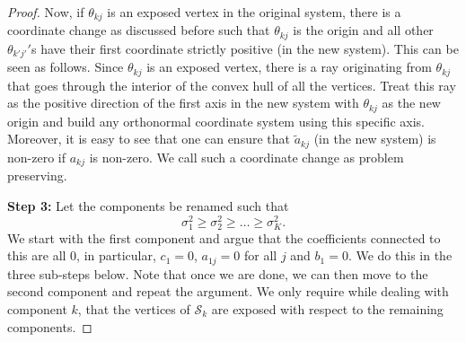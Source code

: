 \documentclass[bj,authoryear]{imsart}
\theoremstyle{plain}
\theoremstyle{remark}
\def\cS{\mathcal{S}}
\begin{document}
\begin{appendix}
\begin{proof}
    Now, if $\theta_{kj}$ is an exposed vertex in the original system, there is a coordinate change as discussed before such that $\theta_{kj}$ is the origin and all other $\theta_{k'j'}'$s have their first coordinate strictly positive (in the new system). This can be seen as follows. Since $\theta_{kj}$ is an exposed vertex, there is a ray originating from $\theta_{kj}$ that goes through the interior of the convex hull of all the vertices. Treat this ray as the positive direction of the first axis in the new system with $\theta_{kj}$ as the new origin and build any orthonormal coordinate system using this specific axis. Moreover, it is easy to see that one can ensure that $\tilde{a}_{kj}$ (in the new system) is non-zero if $a_{kj}$ is non-zero. We call such a coordinate change as problem preserving.
    
    \vspace{1em}
    \textbf{Step 3: } Let the components be renamed such that 
    $$\sigma_1^2 \geq \sigma_2^2 \geq \dots \geq \sigma_K^2.$$
    We start with the first component and argue that the coefficients connected to this are all 0, in particular, $c_1=0$, $a_{1j}=0$ for all $j$ and $b_1=0$. We do this in the three sub-steps below. Note that once we are done, we can then move to the second component and repeat the argument. We only require while dealing with component $k$, that the vertices of $\cS_k$ are exposed with respect to the remaining components. 


\end{proof}
\end{appendix}
\end{document}
